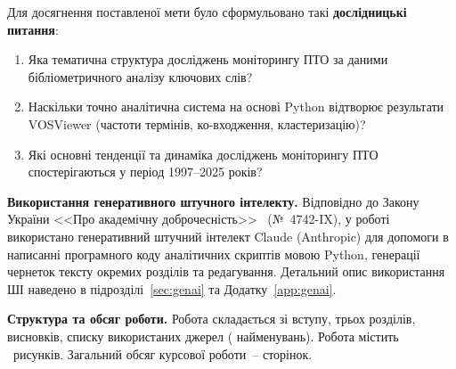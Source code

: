 Для досягнення поставленої мети було сформульовано такі \textbf{дослідницькі питання}:

\begin{enumerate}
    \item Яка тематична структура досліджень моніторингу ПТО за даними бібліометричного аналізу ключових слів?
    \item Наскільки точно аналітична система на основі Python відтворює результати VOSViewer (частоти термінів, ко-входження, кластеризацію)?
    \item Які основні тенденції та динаміка досліджень моніторингу ПТО спостерігаються у період 1997--2025 років?
\end{enumerate}

\textbf{Використання генеративного штучного інтелекту.} Відповідно до Закону України <<Про академічну доброчесність>>~\cite{AkademichnaDobrochesnist2024} (№~4742-IX), у роботі використано генеративний штучний інтелект Claude (Anthropic) для допомоги в написанні програмного коду аналітичних скриптів мовою Python, генерації чернеток тексту окремих розділів та редагування. Детальний опис використання ШІ наведено в підрозділі~\ref{sec:genai} та Додатку~\ref{app:genai}.

\textbf{Структура та обсяг роботи.} Робота складається зі вступу, трьох розділів, висновків, списку використаних джерел ( найменувань). Робота містить \totalfigures\ рисунків.
Загальний обсяг курсової роботи~-- \pageref{last_page} сторінок.
